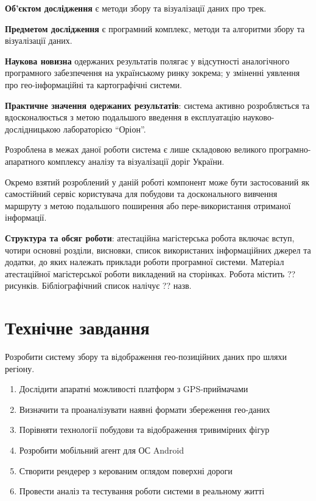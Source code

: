 \documentclass[simple,a4paper,14pt,ukrainian,utf8]{eskdtext}
\begin{document}
	\textbf{Об’єктом дослідження} є методи збору та візуалізації даних про трек.

	\textbf{Предметом дослідження} є програмний комплекс, методи та алгоритми збору та візуалізації даних.

	\textbf{Наукова новизна} одержаних результатів полягає у відсутності аналогічного програмного забезпечення на українському ринку зокрема; у зміненні уявлення про гео-інформаційні та картографічні системи.

	\textbf{Практичне значення одержаних результатів}: система активно розробляється та вдосконалюється з метою подальшого введення в експлуатацію науково-дослідницькою лабораторією “Оріон”. 

	Розроблена в межах даної роботи система є лише складовою великого програмно-апаратного комплексу аналізу та візуалізації доріг України. 

	Окремо взятий розроблений у даній роботі компонент може бути застосований як самостійний сервіс користувача для побудови та досконального вивчення маршруту з метою подальшого поширення або пере-використання отриманої інформації.

	\textbf{Структура та обсяг роботи}: атестаційна магістерська робота включає вступ, чотири основні розділи, висновки, список використаних інформаційних джерел та додатки, до яких належать приклади роботи програмної системи. Матеріал атестаційної магістерської роботи викладений на \pageref{LastPage} сторінках. Робота містить ?? рисунків. Бібліографічний список налічує ?? назв.

\clearpage \newpage \section{Технічне завдання}

    Розробити систему збору та відображення гео-позиційних даних про шляхи регіону.

    \begin{enumerate}
        \item Дослідити апаратні можливості платформ з GPS-приймачами
        \item Визначити та проаналізувати наявні формати збереження гео-даних
        \item Порівняти технології побудови та відображення тривимірних фігур
        \item Розробити мобільний агент для ОС Android
        \item Створити рендерер з керованим оглядом поверхні дороги
        \item Провести аналіз та тестування роботи системи в реальному житті
    \end{enumerate}
\end{document}

